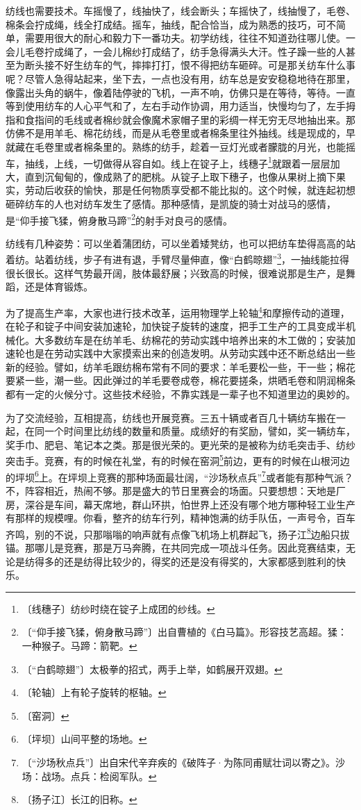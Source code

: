 \documentclass[12pt,UTF-8,openany]{ctexbook}
\begin{document}
\begin{normalsize}
    纺线也需要技术。车摇慢了，线抽快了，线会断头；车摇快了，线抽慢了，毛卷、棉条会拧成绳，线全打成结。摇车，抽线，配合恰当，成为熟悉的技巧，可不简单，需要用很大的耐心和毅力下一番功夫。初学纺线，往往不知道劲往哪儿使。一会儿毛卷拧成绳了，一会儿棉纱打成结了，纺手急得满头大汗。性子躁一些的人甚至为断头接不好生纺车的气，摔摔打打，恨不得把纺车砸碎。可是那关纺车什么事呢？尽管人急得站起来，坐下去，一点也没有用，纺车总是安安稳稳地待在那里，像露出头角的蜗牛，像着陆停驶的飞机，一声不响，仿佛只是在等待，等待。一直等到使用纺车的人心平气和了，左右手动作协调，用力适当，快慢均匀了，左手拇指和食指间的毛线或者棉纱就会像魔术家帽子里的彩绸一样无穷无尽地抽出来。那仿佛不是用羊毛、棉花纺线，而是从毛卷里或者棉条里往外抽线。线是现成的，早就藏在毛卷里或者棉条里的。熟练的纺手，趁着一豆灯光或者朦胧的月光，也能摇车，抽线，上线，一切做得从容自如。线上在锭子上，线穗子\footnote{〔线穗子〕纺纱时绕在锭子上成团的纱线。}就跟着一层层加大，直到沉甸甸的，像成熟了的肥桃。从锭子上取下穗子，也像从果树上摘下果实，劳动后收获的愉快，那是任何物质享受都不能比拟的。这个时候，就连起初想砸碎纺车的人也对纺车发生了感情。那种感情，是凯旋的骑士对战马的感情，是“仰手接飞猱，俯身散马蹄”\footnote{〔“仰手接飞猱，俯身散马蹄”〕出自曹植的《白马篇》。形容技艺高超。猱：一种猴子。马蹄：箭靶。}的射手对良弓的感情。
    
    纺线有几种姿势：可以坐着蒲团纺，可以坐着矮凳纺，也可以把纺车垫得高高的站着纺。站着纺线，步子有进有退，手臂尽量伸直，像“白鹤晾翅”\footnote{〔“白鹤晾翅”〕太极拳的招式，两手上举，如鹤展开双翅。}，一抽线能拉得很长很长。这样气势最开阔，肢体最舒展；兴致高的时候，很难说那是生产，是舞蹈，还是体育锻炼。
    
    为了提高生产率，大家也进行技术改革，运用物理学上轮轴\footnote{〔轮轴〕上有轮子旋转的枢轴。}和摩擦传动的道理，在轮子和锭子中间安装加速轮，加快锭子旋转的速度，把手工生产的工具变成半机械化。大多数纺车是在纺羊毛、纺棉花的劳动实践中培养出来的木工做的；安装加速轮也是在劳动实践中大家摸索出来的创造发明。从劳动实践中还不断总结出一些新的经验。譬如，纺羊毛跟纺棉布常有不同的要求：羊毛要松一些，干一些；棉花要紧一些，潮一些。因此弹过的羊毛要卷成卷，棉花要搓条，烘晒毛卷和阴润棉条都有一定的火候分寸。这些技术经验，不靠实践是一辈子也不知道里边的奥妙的。
    
    为了交流经验，互相提高，纺线也开展竞赛。三五十辆或者百几十辆纺车搬在一起，在同一个时间里比纺线的数量和质量。成绩好的有奖励，譬如，奖一辆纺车，奖手巾、肥皂、笔记本之类。那是很光荣的。更光荣的是被称为纺毛突击手、纺纱突击手。竞赛，有的时候在礼堂，有的时候在窑洞\footnote{〔窑洞〕}前边，更有的时候在山根河边的坪坝\footnote{〔坪坝〕山间平整的场地。}上。在坪坝上竞赛的那种场面最壮阔，“沙场秋点兵”\footnote{〔“沙场秋点兵”〕出自宋代辛弃疾的《破阵子·为陈同甫赋壮词以寄之》。沙场：战场。点兵：检阅军队。}或者能有那种气派？不，阵容相近，热闹不够。那是盛大的节日里赛会的场面。只要想想：天地是厂房，深谷是车间，幕天席地，群山环拱，怕世界上还没有哪个地方哪种轻工业生产有那样的规模哩。你看，整齐的纺车行列，精神饱满的纺手队伍，一声号令，百车齐鸣，别的不说，只那嗡嗡的响声就有点像飞机场上机群起飞，扬子江\footnote{〔扬子江〕长江的旧称。}边船只拔锚。那哪儿是竞赛，那是万马奔腾，在共同完成一项战斗任务。因此竞赛结束，无论是纺得多的还是纺得比较少的，得奖的还是没有得奖的，大家都感到胜利的快乐。
    

\end{normalsize}
\end{document}
